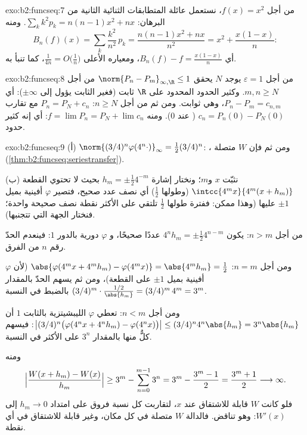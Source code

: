 \begin{solution}{exo:b2:funcseq:7}
من أجل $f(x) = x^2$، نستعمل عائلة المتطابقات الثنائية الثانية من
البرهان: $\sum_k k^2 p_k = n(n-1)x^2 + nx$. ومنه
\[
B_n(f)(x) = \sum_k \frac{k^2}{n^2}\,p_k
= \frac{n(n-1)x^2 + nx}{n^2}
= x^2 + \frac{x(1 - x)}{n} :
\]
أي $B_n(f) - f = \frac{x(1-x)}{n}$، ومعياره الأعلى $\frac{1}{4n} =
O\bigl(\frac1n\bigr)$، كما تنبأ به.
\end{solution}

\begin{solution}{exo:b2:funcseq:8}
من أجل $\varepsilon = 1$ يوجد $N$ يحقق $\norm{P_n - P_m}_{\infty,
\R} \leq 1$ من أجل $m, n \geq N$. وكثير الحدود المحدود على $\R$
ثابت (فغير الثابت يؤول إلى $\pm\infty$): أي $P_n - P_m =
c_{n,m}$، وهي ثوابت. ومن ثم من أجل $n \geq N$: $P_n = P_N + c_n$ مع
تقارب $c_n = P_n(0) - P_N(0)$ ( عند $0$).
ومنه $f = \lim P_n = P_N + \lim c_n$: أي إنه كثير حدود.
\end{solution}

\begin{solution}{exo:b2:funcseq:9}
(أ) $\norm{(3/4)^n\varphi(4^n\cdot)}_\infty = \frac12
(3/4)^n$: ، ومن ثم فإن $W$ متصلة
(\cref{thm:b2:funcseq:seriestransfer}).

(ب) نثبّت $x$ و$m$؛ ونختار إشارة $h_m = \pm\frac12 4^{-m}$ بحيث
لا تحتوي القطعة $\intcc{4^mx}{4^m(x + h_m)}$ (وطولها $\frac12$)
أي نصف عدد صحيح، فتصير $\varphi$ أفينية بميل $\pm1$
عليها (وهذا ممكن: ففترة طولها $\frac12$ تلتقي على الأكثر نقطة
نصف صحيحة واحدة؛ فنختار الجهة التي تتجنبها).

من أجل $n > m$: يكون $4^n h_m = \pm\frac12 4^{n-m}$ عددًا صحيحًا، و
$\varphi$ دورية بالدور $1$: فينعدم الحدّ رقم $n$ من الفرق.

ومن أجل $n = m$: $\abs{\varphi(4^m x + 4^m h_m) - \varphi(4^m x)} =
\abs{4^m h_m} = \frac12$ (لأن $\varphi$ أفينية بميل $\pm 1$ على
القطعة)، ومن ثم يسهم الحدّ بالمقدار $(3/4)^m \cdot
\frac{1/2}{\abs{h_m}} = (3/4)^m\,4^m = 3^m$ بالضبط في النسبة.

ومن أجل $n < m$: تعطي $\varphi$ الليبشيتزية بالثابت $1$ أن
$\bigl|(3/4)^n\bigl(\varphi(4^nx + 4^nh_m) -
\varphi(4^nx)\bigr)\bigr| \leq (3/4)^n 4^n\abs{h_m} =
3^n\abs{h_m}$: فيسهم كلٌّ منها بالمقدار $3^n$ على الأكثر في النسبة.

ومنه
\[
\Bigl|\frac{W(x + h_m) - W(x)}{h_m}\Bigr|
\geq 3^m - \sum_{n=0}^{m-1} 3^n
= 3^m - \frac{3^m - 1}{2} = \frac{3^m + 1}{2}
\longrightarrow \infty .
\]
فلو كانت $W$ قابلة للاشتقاق عند $x$، لتقاربت كل نسبة فروق على امتداد
$h_m \to 0$ إلى $W'(x)$: وهو تناقض. فالدالة $W$
متصلة في كل مكان، وغير قابلة للاشتقاق في أي نقطة.
\end{solution}

